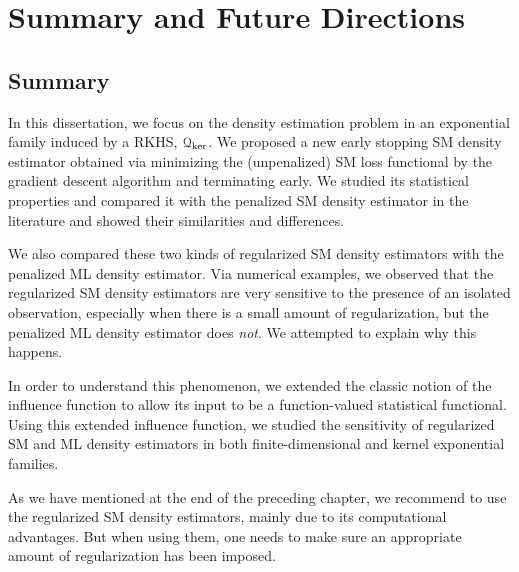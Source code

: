 \chapter{Summary and Future Directions}
\label{ch7}


\section{Summary}

In this dissertation, we focus on the density estimation problem in an exponential family induced by a RKHS, $\mathcal{Q}_{\ker}$. We proposed a new early stopping SM density estimator obtained via minimizing the (unpenalized) SM loss functional by the gradient descent algorithm and terminating early. We studied its statistical properties and compared it with the penalized SM density estimator in the literature and showed their similarities and differences. 

We also compared these two kinds of regularized SM density estimators with the penalized ML density estimator. Via numerical examples, we observed that the regularized SM density estimators are very sensitive to the presence of an isolated observation, especially when there is a small amount of regularization, but the penalized ML density estimator does \emph{not}. We attempted to explain why this happens. 

In order to understand this phenomenon, we extended the classic notion of the influence function to allow its input to be a function-valued statistical functional. Using this extended influence function, we studied the sensitivity of regularized SM and ML density estimators in both finite-dimensional and kernel exponential families. 

As we have mentioned at the end of the preceding chapter, we recommend to use the regularized SM density estimators, mainly due to its computational advantages. But when using them, one needs to make sure an appropriate amount of regularization has been imposed. 


